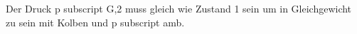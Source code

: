 Der Druck p subscript G,2 muss gleich wie Zustand 1 sein um in Gleichgewicht zu sein mit Kolben und p subscript amb.